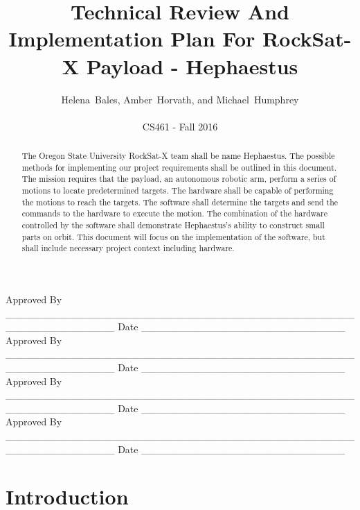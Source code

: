 \documentclass[letterpaper,10pt]{article}
\title{Technical Review And Implementation Plan For RockSat-X Payload - Hephaestus}
\author{Helena~Bales, Amber~Horvath, and Michael~Humphrey\\ \\ CS461 - Fall 2016}
\newenvironment{bottompar}{\par\vspace*{\fill}}{\clearpage}
\begin{document}
\maketitle

\begin{abstract}
The Oregon State University RockSat-X team shall be name Hephaestus.
The possible methods for implementing our project requirements shall be outlined in this document.
The mission requires that the \gls{payload}, an autonomous robotic arm, perform a series of motions to locate predetermined targets.
The hardware shall be capable of performing the motions to reach the targets.
The software shall determine the targets and send the commands to the hardware to execute the motion.
The combination of the hardware controlled by the software shall demonstrate Hephaestus's ability to construct small parts on orbit.
This document will focus on the implementation of the software, but shall include necessary project context including hardware.
\end{abstract}

\begin{bottompar}
Approved By
\_\_\_\_\_\_\_\_\_\_\_\_\_\_\_\_\_\_\_\_\_\_\_\_\_\_\_\_\_\_\_\_\_\_\_\_\_\_\_\_\_\_\_\_\_\_\_\_\_\_\_\_\_\_\_\_\_\_\_\_\_\_\_
Date \_\_\_\_\_\_\_\_\_\_\_\_\_\_\_\_\_\_\_\_\_\_\_\_\_\_\_\_ \\


Approved By
\_\_\_\_\_\_\_\_\_\_\_\_\_\_\_\_\_\_\_\_\_\_\_\_\_\_\_\_\_\_\_\_\_\_\_\_\_\_\_\_\_\_\_\_\_\_\_\_\_\_\_\_\_\_\_\_\_\_\_\_\_\_\_
Date \_\_\_\_\_\_\_\_\_\_\_\_\_\_\_\_\_\_\_\_\_\_\_\_\_\_\_\_ \\


Approved By
\_\_\_\_\_\_\_\_\_\_\_\_\_\_\_\_\_\_\_\_\_\_\_\_\_\_\_\_\_\_\_\_\_\_\_\_\_\_\_\_\_\_\_\_\_\_\_\_\_\_\_\_\_\_\_\_\_\_\_\_\_\_\_
Date \_\_\_\_\_\_\_\_\_\_\_\_\_\_\_\_\_\_\_\_\_\_\_\_\_\_\_\_ \\


Approved By
\_\_\_\_\_\_\_\_\_\_\_\_\_\_\_\_\_\_\_\_\_\_\_\_\_\_\_\_\_\_\_\_\_\_\_\_\_\_\_\_\_\_\_\_\_\_\_\_\_\_\_\_\_\_\_\_\_\_\_\_\_\_\_
Date \_\_\_\_\_\_\_\_\_\_\_\_\_\_\_\_\_\_\_\_\_\_\_\_\_\_\_\_ \\
\end{bottompar}

\clearpage
\tableofcontents
\clearpage

\section{Introduction}
\end{document}
